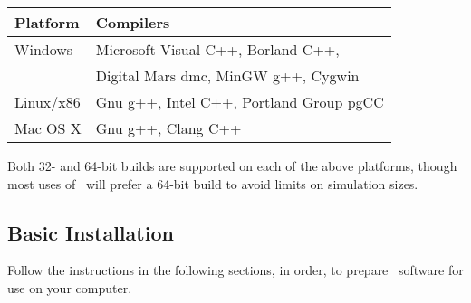 \begin{center}
\begin{makeimage}
\begin{tabular}{|l|l|}\hline
Platform & Compilers \\ \hline
Windows &
Microsoft Visual C++, Borland C++, \\
 & Digital Mars dmc, MinGW g++, Cygwin
\\
Linux/x86 & Gnu g++, Intel C++, Portland Group pgCC \\
Mac OS X & Gnu g++, Clang C++ \\
\hline
\end{tabular}
\end{makeimage}
\end{center}

\par\noindent
Both 32- and 64-bit builds are supported on each of the above
platforms, though most uses of \OOMMF\ will prefer a 64-bit
build to avoid limits on simulation sizes.


\subsection{Basic Installation}

Follow the instructions in the following sections, in order,
to prepare \OOMMF\ software for use on your computer.

